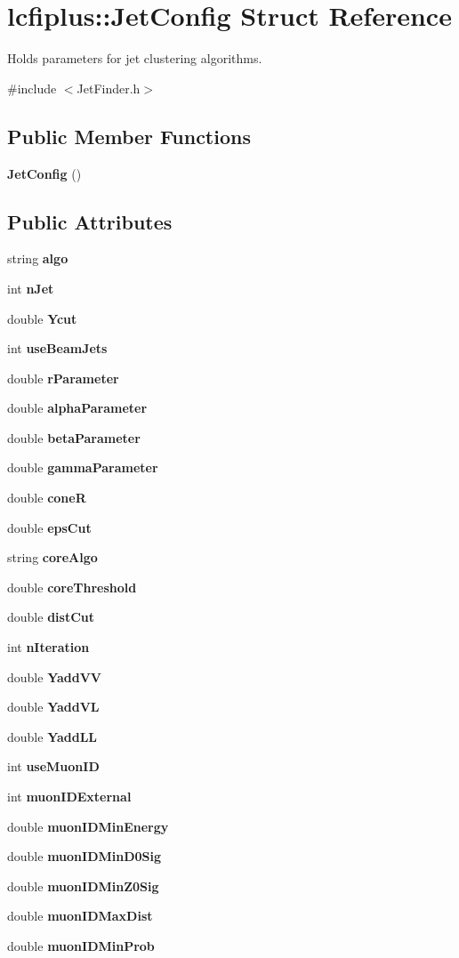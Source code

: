 \section{lcfiplus\+:\+:Jet\+Config Struct Reference}
\label{structlcfiplus_1_1JetConfig}


Holds parameters for jet clustering algorithms.  




{\ttfamily \#include $<$Jet\+Finder.\+h$>$}

\subsection*{Public Member Functions}
\begin{DoxyCompactItemize}
\item 
\textbf{ Jet\+Config} ()
\end{DoxyCompactItemize}
\subsection*{Public Attributes}
\begin{DoxyCompactItemize}
\item 
string \textbf{ algo}
\item 
int \textbf{ n\+Jet}
\item 
double \textbf{ Ycut}
\item 
int \textbf{ use\+Beam\+Jets}
\item 
double \textbf{ r\+Parameter}
\item 
double \textbf{ alpha\+Parameter}
\item 
double \textbf{ beta\+Parameter}
\item 
double \textbf{ gamma\+Parameter}
\item 
double \textbf{ coneR}
\item 
double \textbf{ eps\+Cut}
\item 
string \textbf{ core\+Algo}
\item 
double \textbf{ core\+Threshold}
\item 
double \textbf{ dist\+Cut}
\item 
int \textbf{ n\+Iteration}
\item 
double \textbf{ Yadd\+VV}
\item 
double \textbf{ Yadd\+VL}
\item 
double \textbf{ Yadd\+LL}
\item 
int \textbf{ use\+Muon\+ID}
\item 
int \textbf{ muon\+I\+D\+External}
\item 
double \textbf{ muon\+I\+D\+Min\+Energy}
\item 
double \textbf{ muon\+I\+D\+Min\+D0\+Sig}
\item 
double \textbf{ muon\+I\+D\+Min\+Z0\+Sig}
\item 
double \textbf{ muon\+I\+D\+Max\+Dist}
\item 
double \textbf{ muon\+I\+D\+Min\+Prob}
\end{DoxyCompactItemize}



